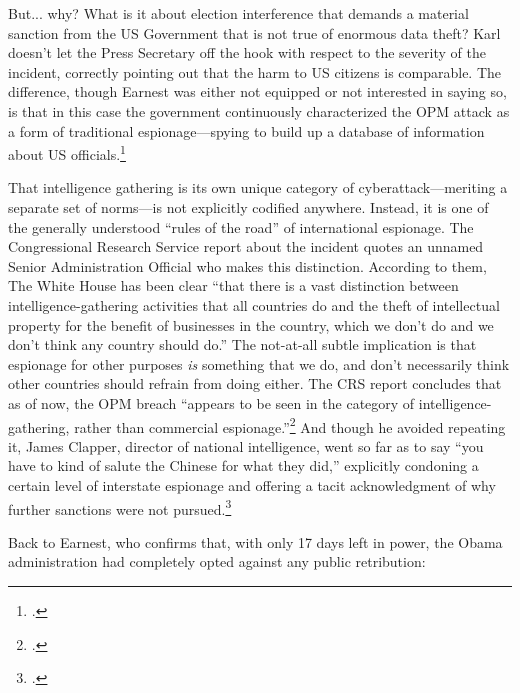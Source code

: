 \documentclass{report}
\begin{document}
\begin{refsegment}
But... why? What is it about election interference that demands a material sanction from the US Government that is not true of enormous data theft? Karl doesn't let the Press Secretary off the hook with respect to the severity of the incident, correctly pointing out that the harm to US citizens is comparable. The difference, though Earnest was either not equipped or not interested in saying so, is that in this case the government continuously characterized the OPM attack as a form of traditional espionage---spying to build up a database of information about US officials.\footcite{nakashima_chinese_2015}

That intelligence gathering is its own unique category of cyberattack---meriting a separate set of norms---is not explicitly codified anywhere. Instead, it is one of the generally understood ``rules of the road'' of international espionage. The Congressional Research Service report about the incident quotes an unnamed Senior Administration Official who makes this distinction. According to them, The White House has been clear ``that there is a vast distinction between intelligence-gathering activities that all countries do and the theft of intellectual property for the benefit of businesses in the country, which we don't do and we don't think any country should do.'' The not-at-all subtle implication is that espionage for other purposes \emph{is} something that we do, and don't necessarily think other countries should refrain from doing either. The CRS report concludes that as of now, the OPM breach ``appears to be seen in the category of intelligence-gathering, rather than commercial espionage.''\footcite{finklea_cyber_2015} And though he avoided repeating it, James Clapper, director of national intelligence, went so far as to say ``you have to kind of salute the Chinese for what they did,'' explicitly condoning a certain level of interstate espionage and offering a tacit acknowledgment of why further sanctions were not pursued.\footcite{sanger_u.s._2015}

Back to Earnest, who confirms that, with only 17 days left in power, the Obama administration had completely opted against any public retribution:


\end{refsegment}
\end{document}
